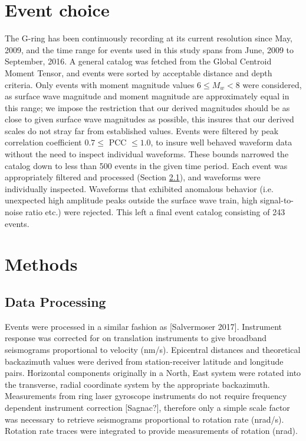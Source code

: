 \documentclass{gji}
\begin{document}
\section{Event choice}
The G-ring has been continuously recording at its current resolution since May, 2009, %
and the time range for events used in this study spans from June, 2009 to September, 2016. A general catalog was fetched from the Global Centroid Moment Tensor, %
and events were sorted by acceptable distance and depth criteria. Only events with moment magnitude values $6 \le M_w < 8$ were considered, as surface wave magnitude and moment magnitude are approximately equal in this range; %
we impose the restriction that our derived magnitudes should be as close to given surface wave magnitudes as possible, this insures that our derived scales do not stray far from established values. Events were filtered by peak correlation coefficient $0.7 \le$ PCC $\le 1.0$, to insure well behaved waveform data without the need to inspect individual waveforms. These bounds narrowed the catalog down to less than 500 events in the given time period. Each event was appropriately filtered and processed (Section \ref{sec:dataproc}), and waveforms were individually inspected. Waveforms that exhibited anomalous behavior (i.e. unexpected high amplitude peaks outside the surface wave train, high signal-to-noise ratio etc.) were rejected. This left a final event catalog consisting of 243 events.

\section{Methods}
\subsection{Data Processing}\label{sec:dataproc}
Events were processed in a similar fashion as [Salvermoser 2017]. %
Instrument response was corrected for on translation instruments to give broadband seismograms proportional to velocity (nm/s). Epicentral distances and theoretical backazimuth values were derived from station-receiver latitude and longitude pairs. Horizontal components originally in a North, East system were rotated into the transverse, radial coordinate system by the appropriate backazimuth. Measurements from ring laser gyroscope instruments do not require frequency dependent instrument correction [Sagnac?], %
therefore only a simple scale factor was necessary to retrieve seismograms proportional to rotation rate (nrad/s). Rotation rate traces were integrated to provide measurements of rotation (nrad).
\end{document}
